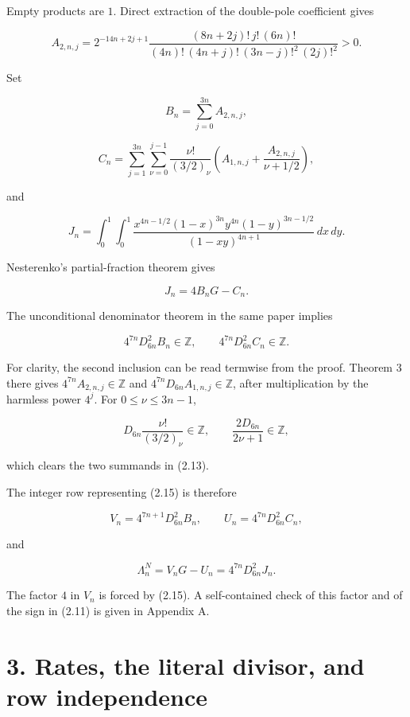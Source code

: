 \documentclass[
  11pt,
]{article}
\begin{document}
Empty products are \(1\). Direct extraction of the double-pole
coefficient gives

\[
 A_{2,n,j}=2^{-14n+2j+1}
 \frac{(8n+2j)!\,j!\,(6n)!}
 {(4n)!\,(4n+j)!\,(3n-j)!^2\,(2j)!^2}>0.            \tag{2.11}
\]

Set

\[
 B_n=\sum_{j=0}^{3n}A_{2,n,j},                       \tag{2.12}
\]

\[
 C_n=\sum_{j=1}^{3n}\sum_{\nu=0}^{j-1}
 \frac{\nu!}{(3/2)_\nu}
 \left(A_{1,n,j}+\frac{A_{2,n,j}}{\nu+1/2}\right),   \tag{2.13}
\]

and

\[
 J_n=\int_0^1\!\int_0^1
 \frac{x^{4n-1/2}(1-x)^{3n}y^{4n}(1-y)^{3n-1/2}}
 {(1-xy)^{4n+1}}\,dx\,dy.                            \tag{2.14}
\]

Nesterenko's partial-fraction theorem gives

\[
 J_n=4B_nG-C_n.                                      \tag{2.15}
\]

The unconditional denominator theorem in the same paper implies

\[
 4^{7n}D_{6n}^2B_n\in\mathbb Z,\qquad
 4^{7n}D_{6n}^2C_n\in\mathbb Z.                     \tag{2.16}
\]

For clarity, the second inclusion can be read termwise from the proof.
Theorem 3 there gives \(4^{7n}A_{2,n,j}\in\mathbb Z\) and
\(4^{7n}D_{6n}A_{1,n,j}\in\mathbb Z\), after multiplication by the
harmless power \(4^j\). For \(0\le\nu\le3n-1\),

\[
 D_{6n}\frac{\nu!}{(3/2)_\nu}\in\mathbb Z,\qquad
 \frac{2D_{6n}}{2\nu+1}\in\mathbb Z,
\]

which clears the two summands in (2.13).

The integer row representing (2.15) is therefore

\[
 V_n=4^{7n+1}D_{6n}^2B_n,\qquad
 U_n=4^{7n}D_{6n}^2C_n,                              \tag{2.17}
\]

and

\[
 \Lambda_n^N=V_nG-U_n=4^{7n}D_{6n}^2J_n.            \tag{2.18}
\]

The factor \(4\) in \(V_n\) is forced by (2.15). A self-contained check
of this factor and of the sign in (2.11) is given in Appendix A.

\hypertarget{rates-the-literal-divisor-and-row-independence}{%
\section{3. Rates, the literal divisor, and row
independence}\label{rates-the-literal-divisor-and-row-independence}}
\end{document}
